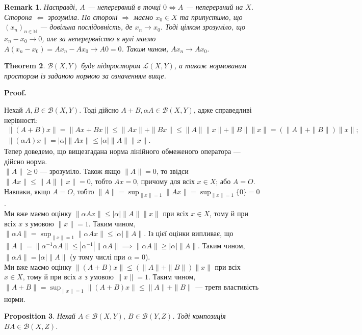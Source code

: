 \documentclass[a4paper, 10pt]{article}
\makeatletter
\def\rightproof{$\boxed{\Rightarrow}$ }
\def\leftproof{$\boxed{\Leftarrow}$ }
\theoremstyle{theoremdd}
\newtheorem{theorem}{Theorem}[subsection]
\theoremstyle{theoremdd}
\theoremstyle{theoremdd}
\theoremstyle{theoremdd}
\theoremstyle{theoremdd}
\newtheorem{proposition}[theorem]{Proposition}
\theoremstyle{theoremdd}
\newtheorem{remark}[theorem]{Remark}
\theoremstyle{theoremdd}
\theoremstyle{theoremdd}
\renewenvironment{proof}[1][Proof.\\]{\par
\pushQED{\hfill \qed}%
\normalfont \topsep6\p@\@plus6\p@\relax
\trivlist
\item\relax
{\bfseries
#1\@addpunct{.}}\hspace\labelsep\ignorespaces
}{%
\popQED\endtrivlist\@endpefalse
}
\makeatother
\begin{document}
\begin{remark}
Насправді, $A$ --- неперервний в точці $0 \iff A$ --- неперервний на $X$.\\
Сторона \leftproof зрозуміла. По стороні \rightproof маємо $x_0 \in X$ та припустимо, що $(x_n)_{n \in \mathbb{N}}$ --- довільна послідовність, де $x_n \to x_0$. Тоді цілком зрозуміло, що $x_n - x_0 \to 0$, але за неперервністю в нулі маємо $A(x_n - x_0) = A x_n - A x_0 \to A0 = 0$. Таким чином, $A x_n \to A x_0$.
\end{remark}

\begin{theorem}
$\mathcal{B}(X,Y)$ буде підпростором $\mathcal{L}(X,Y)$, а також нормованим простором із заданою нормою за означенням вище.
\end{theorem}

\begin{proof}
Нехай $A,B \in \mathcal{B}(X,Y)$. Тоді дійсно $A+B, \alpha A \in \mathcal{B}(X,Y)$, адже справедливі нерівності:
\begin{align*}
\| (A+B) x \| = \| Ax + Bx \| \leq \|Ax \| + \|Bx\| \leq \|A\| \|x\| + \|B\| \|x \| = (\|A\| + \|B\|) \|x\|; \\
\| (\alpha A) x \| = |\alpha| \|Ax\| \leq |\alpha| \|A\| \|x\|.
\end{align*}
Тепер доведемо, що вищезгадана норма лінійного обмеженого оператора --- дійсно норма.\\
$\|A\| \geq 0$ --- зрозуміло. Також якщо $\|A\| = 0$, то звідси $\|Ax\| \leq \|A\| \|x\| = 0$, тобто $Ax = 0$, причому для всіх $x \in X$; або $A = O$. Навпаки, якщо $A = O$, тобто $\|A\| = \displaystyle\sup_{\|x\| = 1} \|Ax\| = \sup_{\|x\|= 1} \{0\} = 0$.\\
Ми вже маємо оцінку $\| \alpha Ax\| \leq |\alpha| \|A\| \|x\|$ при всіх $x \in X$, тому й при всіх $x$ з умовою $\|x\| = 1$. Таким чином, $\|\alpha A\| = \displaystyle\sup_{\|x\|= 1} \|\alpha Ax\| \leq |\alpha|\|A\|$. Із цієї оцінки випливає, що $\|A\| = \|\alpha^{-1} \alpha A\| \leq |\alpha^{-1}| \|\alpha A\| \implies \|\alpha A\| \geq |\alpha| \|A\|$. Таким чином, $\|\alpha A\| = |\alpha| \|A\|$ (у тому числі при $\alpha = 0$).\\
Ми вже маємо оцінку $\| (A+B) x\| \leq (\|A\| + \|B\|) \|x\|$ при всіх $x \in X$, тому й при всіх $x$ з умовою $\|x\| = 1$. Таким чином, $\|A+B\| = \displaystyle\sup_{\|x\| = 1} \|(A+B)x\| \leq \|A\| + \|B\|$ --- третя властивість норми.
\end{proof}

\begin{proposition}
Нехай $A \in \mathcal{B}(X,Y),\ B \in \mathcal{B}(Y,Z)$. Тоді композиція $BA \in \mathcal{B}(X,Z)$.
\end{proposition}
\end{document}
